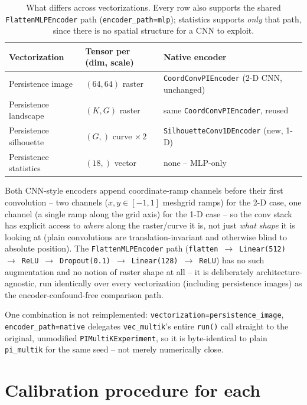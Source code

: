 \documentclass[11pt]{article}
\begin{document}
\begin{table}[h]
\centering
\begin{tabular}{@{}lll@{}}
\toprule
Vectorization & Tensor per (dim, scale) & Native encoder \\
\midrule
Persistence image  & $(64,64)$ raster & \texttt{CoordConvPIEncoder} (2-D CNN, unchanged) \\
Persistence landscape & $(K,G)$ raster & same \texttt{CoordConvPIEncoder}, reused \\
Persistence silhouette & $(G,)$ curve $\times\,2$\footnotemark & \texttt{SilhouetteConv1DEncoder} (new, 1-D) \\
Persistence statistics & $(18,)$ vector & none -- MLP-only \\
\bottomrule
\end{tabular}
\caption{What differs across vectorizations. Every row also supports the shared
\texttt{FlattenMLPEncoder} path (\texttt{encoder\_path=mlp}); statistics supports
\emph{only} that path, since there is no spatial structure for a CNN to exploit.}
\label{tab:pervec}
\end{table}

Both CNN-style encoders append coordinate-ramp channels before their first
convolution -- two channels ($x,y\in[-1,1]$ meshgrid ramps) for the 2-D case, one
channel (a single ramp along the grid axis) for the 1-D case -- so the conv stack has
explicit access to \emph{where} along the raster/curve it is, not just \emph{what
shape} it is looking at (plain convolutions are translation-invariant and otherwise
blind to absolute position). The \texttt{FlattenMLPEncoder} path
(\texttt{flatten}~$\to$~\texttt{Linear(512)}~$\to$~\texttt{ReLU}~$\to$~\texttt{Dropout(0.1)}~$\to$~\texttt{Linear(128)}~$\to$~\texttt{ReLU})
has no such augmentation and no notion of raster shape at all -- it is deliberately
architecture-agnostic, run identically over every vectorization (including
persistence images) as the encoder-confound-free comparison path.

One combination is not reimplemented: \texttt{vectorization=persistence\_image},
\texttt{encoder\_path=native} delegates \texttt{vec\_multik}'s entire \texttt{run()}
call straight to the original, unmodified \texttt{PIMultiKExperiment}, so it is
byte-identical to plain \texttt{pi\_multik} for the same seed -- not merely
numerically close.

\section{Calibration procedure for each}
\label{sec:calibration}
\end{document}
